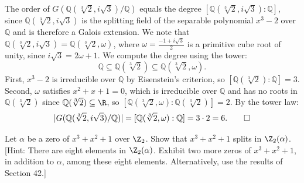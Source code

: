 \begin{solution}
  The order of $G(\mathbb{Q}(\sqrt[3]{2}, i\sqrt{3})/\mathbb{Q})$ equals the degree $[\mathbb{Q}(\sqrt[3]{2}, i\sqrt{3}) : \mathbb{Q}]$, since $\mathbb{Q}(\sqrt[3]{2}, i\sqrt{3})$ is the splitting field of the separable polynomial $x^3 - 2$ over $\mathbb{Q}$ and is therefore a Galois extension. We note that $\mathbb{Q}(\sqrt[3]{2}, i\sqrt{3}) = \mathbb{Q}(\sqrt[3]{2}, \omega)$, where $\omega = \frac{-1 + i\sqrt{3}}{2}$ is a primitive cube root of unity, since $i\sqrt{3} = 2\omega + 1$. We compute the degree using the tower:
  \[%
    \mathbb{Q} \subseteq \mathbb{Q}(\sqrt[3]{2}) \subseteq \mathbb{Q}(\sqrt[3]{2}, \omega)
  .\]%
  First, $x^3 - 2$ is irreducible over $\mathbb{Q}$ by Eisenstein's criterion, so $[\mathbb{Q}(\sqrt[3]{2}) : \mathbb{Q}] = 3$. Second, $\omega$ satisfies $x^2 + x + 1 = 0$, which is irreducible over $\mathbb{Q}$ and has no roots in $\mathbb{Q}(\sqrt[3]{2})$ since $\mathbb{Q}(\sqrt[3]{2}) \subseteq \R$, so $[\mathbb{Q}(\sqrt[3]{2}, \omega) : \mathbb{Q}(\sqrt[3]{2})] = 2$. By the tower law:
  \[%
    |G(\mathbb{Q}(\sqrt[3]{2}, i\sqrt{3})/\mathbb{Q})| = [\mathbb{Q}(\sqrt[3]{2}, \omega) : \mathbb{Q}] = 3 \cdot 2 = 6
  .\qedhere\]%
\end{solution}

\begin{problem}[44.10]
  Let $\alpha$ be a zero of $x^3 + x^2 + 1$ over $\Z_2$. Show that $x^3 + x^2 + 1$ splits in $\Z_2(\alpha)$. [Hint: There are eight elements in $\Z_2(\alpha)$. Exhibit two more zeros of $x^3 + x^2 + 1$, in addition to $\alpha$, among these eight elements. Alternatively, use the results of Section 42.]
\end{problem}


